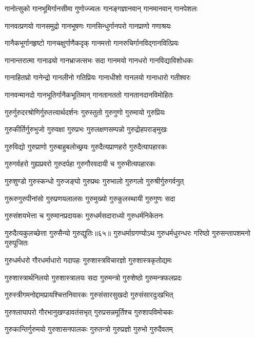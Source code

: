 \twolineshloka
{गानोत्सुको गानभूमिर्गानसीमा गुणोज्ज्वलः}%
{गानङ्गज्ञानवान् गानमानवान् गानपेशलः}%

\twolineshloka
{गानवत्प्रणयो गानसमुद्रो गानभूषणः}%
{गानसिन्धुर्गानपरो गानप्राणो गणाश्रयः}%

\twolineshloka
{गानैकभूर्गानहृष्टो गानचक्षुर्गाणैकदृक्}%
{गानमत्तो गानरुचिर्गानविद्गानवित्प्रियः}%

\twolineshloka
{गानान्तरात्मा गानाढ्यो गानभ्राजत्सभः सदा}%
{गानमयो गानधरो गानविद्याविशोधकः}%

\twolineshloka
{गानाहितघ्रो गानेन्द्रो गानलीनो गतिप्रियः}%
{गानाधीशो गानलयो गानाधारो गतीश्वरः}%

\twolineshloka
{गानवन्मानदो गानभूतिर्गानैकभूतिमान्}%
{गानतानततो गानतानदानविमोहितः}%

\twolineshloka
{गुरुर्गुरुदरश्रोणिर्गुरुतत्त्वार्थदर्शनः}%
{गुरुस्तुतो गुरुगुणो गुरुमायो गुरुप्रियः}%

\twolineshloka
{गुरुकीर्तिर्गुरुभुजो गुरुवक्षा गुरुप्रभः}%
{गुरुलक्षणसम्पन्नो गुरुद्रोहपराङ्मुखः}%

\twolineshloka
{गुरुविद्यो गुरुप्राणो गुरुबाहुबलोच्छ्रयः}%
{गुरुदैत्यप्राणहरो गुरुदैत्यापहारकः}%

\twolineshloka
{गुरुगर्वहरो गुह्यप्रवरो गुरुदर्पहा}%
{गुरुगौरवदायी च गुरुभीत्यपहारकः}%

\twolineshloka
{गुरुशुण्डो गुरुस्कन्धो गुरुजङ्घो गुरुप्रथः}%
{गुरुभालो गुरुगलो गुरुश्रीर्गुरुगर्वनुत्}

\twolineshloka
{गुरूरुगुरुपीनांसो गुरुप्रणयलालसः}%
{गुरुमुख्यो गुरुकुलस्थायी गुरुगुणः सदा}%

\twolineshloka
{गुरुसंशयभेत्ता च गुरुमानप्रदायकः}%
{गुरुधर्मसदाराध्यो गुरुधर्मनिकेतनः}%

{गुरुदैत्यकुलच्छेत्ता गुरुसैन्यो गुरुद्युतिः॥६५॥}
\twolineshloka
{गुरुधर्माग्रगण्योऽथ गुरुधर्मधुरन्धरः}%
{गरिष्ठो गुरुसन्तापशमनो गुरुपूजितः}%

\twolineshloka
{गुरुधर्मधरो गौरधर्माधारो गदापहः}%
{गुरुशास्त्रविचारज्ञो गुरुशास्त्रकृतोद्यमः}%

\twolineshloka
{गुरुशास्त्रार्थनिलयो गुरुशास्त्रालयः सदा}%
{गुरुमन्त्रो गुरुशेष्ठो गुरुमन्त्रफलप्रदः}%

\twolineshloka
{गुरुस्त्रीगमनोद्दामप्रायश्चित्तनिवारकः}%
{गुरुसंसारसुखदो गुरुसंसारदुःखभित्}%

\twolineshloka
{गुरुश्लाघापरो गौरभानुखण्डावतंसभृत्}%
{गुरुप्रसन्नमूर्तिश्च गुरुशापविमोचकः}%

\twolineshloka
{गुरुकान्तिर्गुरुमयो गुरुशासनपालकः}%
{गुरुतन्त्रो गुरुप्रज्ञो गुरुभो गुरुदैवतम्}%

